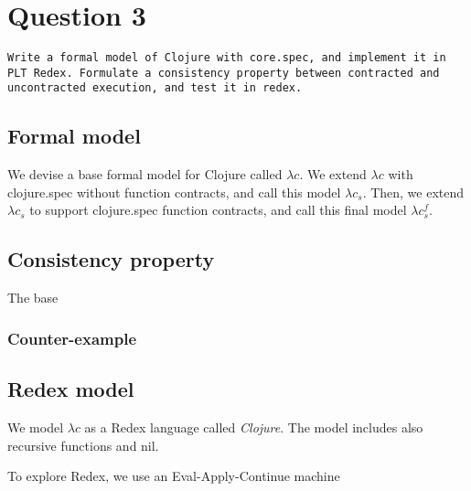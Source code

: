 \section{Question 3}

\begin{verbatim}
Write a formal model of Clojure with core.spec, and implement it in
PLT Redex. Formulate a consistency property between contracted and
uncontracted execution, and test it in redex.
\end{verbatim}

\subsection{Formal model}



We devise a base formal model for Clojure called $\lambda c$.
We extend $\lambda c$ with clojure.spec without function contracts, and call
this model $\lambda c_s$. 
Then, we extend $\lambda c_s$ to support
clojure.spec function contracts, and call this final model $\lambda c_{s}^{f}$.





\subsection{Consistency property}

The base 

\subsubsection{Counter-example}

\subsection{Redex model}

We model $\lambda c$ as a Redex language called \emph{Clojure}.
The model includes also recursive functions and nil.

To explore Redex, we use an Eval-Apply-Continue machine
